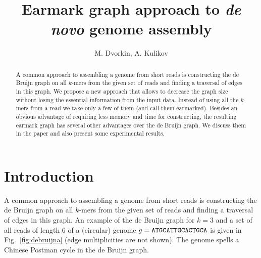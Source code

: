 \documentclass[12pt]{article}
\begin{document}

\author{M. Dvorkin, A. Kulikov}
\title{Earmark graph approach to {\it de novo} genome assembly}
\maketitle

\begin{abstract}
A common approach to assembling a genome from short reads is constructing
the de Bruijn graph on all $k$-mers from the given set of reads and finding
a traversal of edges in this graph. We propose a new approach that allows
to decrease the graph size without losing the essential information from
the input data. Instead of using all the $k$-mers from a read we take only
a few of them (and call them earmarked). Besides an obvious advantage
of requiring less memory and time for constructing, the resulting earmark
graph has several other advantages over the de Bruijn graph. We discuss
them in the paper and also present some experimental results.
\end{abstract}

\tableofcontents


\section{Introduction}
A common approach to assembling a genome from short reads is constructing
the de Bruijn graph \cite{PW01} on all $k$-mers from the given set of 
reads and finding a traversal of edges in this graph.
An example of the de Bruijn graph for $k=3$ and a set of all reads of length $6$
of a (circular) genome $g={\tt ATGCATTGCACTGCA}$ is given in 
Fig.~\ref{fig:debruijna}
(edge multiplicities are not shown). The genome spells a Chinese Postman
cycle in the de Bruijn graph.
\end{document}
